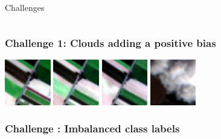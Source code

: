 \documentclass[%
  aspectratio=169,
  9pt,
  USenglish,
  titlegraphic, %
  affiliationintitlepagehead,
  affiliation,
]{beamer}
\begin{document}
{
	\begin{frame}[plain]
	
	\vfill
	\Huge\color{white}
	\begin{center}
		\begin{columns}
			\vspace{7em}
			
			\hfill 
			Challenges
			
		\end{columns}
	\end{center}
	
	\vfill
\end{frame}
}



\begin{frame}
\frametitle{Challenge 1: Clouds adding a positive bias}

\includegraphics[width=2cm]{images/s2grid/1}
\includegraphics[width=2cm]{images/s2grid/2}
\includegraphics[width=2cm]{images/s2grid/3}
\includegraphics[width=2cm]{images/s2grid/4}

%
\examplecorn

\end{frame}

\begin{frame}
\frametitle{Challenge : Imbalanced class labels}


\end{frame}
\end{document}
